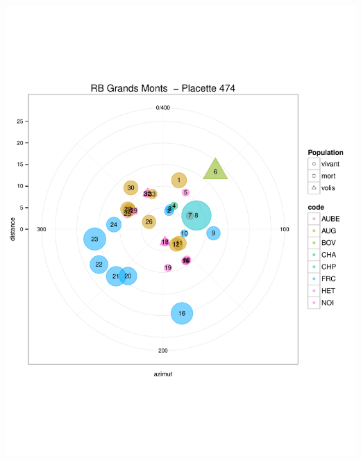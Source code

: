 \documentclass[a4paper]{book}\usepackage[]{graphicx}\usepackage[]{color}
\makeatletter
\def\maxwidth{ %
  \ifdim\Gin@nat@width>\linewidth
    \linewidth
  \else
    \Gin@nat@width
  \fi
}
\newenvironment{knitrout}{}{} %
\makeatother
\begin{document}
\begin{knitrout}
{\centering \includegraphics[width=\maxwidth]{Figures/PlanArbres-53} 

}





\end{knitrout}
\end{document}
